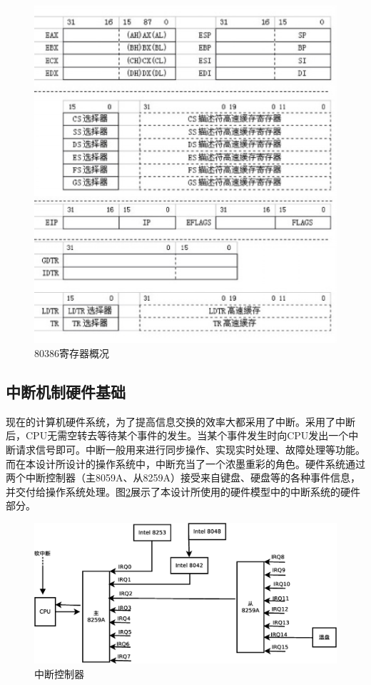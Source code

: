 \documentclass[UTF8,nofonts,cs4size]{ctexrep}
\begin{document}
\begin{figure}[htp]
\centering
\includegraphics[scale=1]{80386.eps}
\caption{80386寄存器概况}
\label{80386}
\end{figure}


\subsection{中断机制硬件基础}
现在的计算机硬件系统，为了提高信息交换的效率大都采用了中断。采用了中断后，CPU无需空转去等待某个事件的发生。当某个事件发生时向CPU发出一个中断请求信号即可。中断一般用来进行同步操作、实现实时处理、故障处理等功能。而在本设计所设计的操作系统中，中断充当了一个浓墨重彩的角色。硬件系统通过两个中断控制器（主8059A、从8259A）接受来自键盘、硬盘等的各种事件信息，并交付给操作系统处理。图\ref{interrupt}展示了本设计所使用的硬件模型中的中断系统的硬件部分。
\begin{figure}[htp]
\centering
\includegraphics[scale=0.38]{interrupt.eps}
\caption{中断控制器}
\label{interrupt}
\end{figure}
\end{document}
